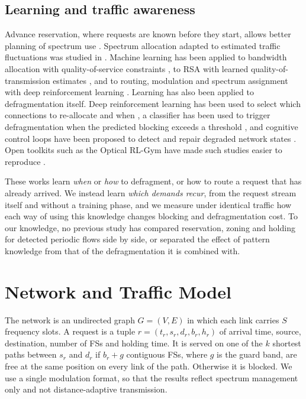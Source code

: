 \documentclass[preprint,12pt]{elsarticle}
\begin{document}
\subsection{Learning and traffic awareness}
Advance reservation, where requests are known before they start, allows better planning of spectrum use \cite{lu2013ar}. Spectrum allocation adapted to estimated traffic fluctuations was studied in \cite{chino2016}. Machine learning has been applied to bandwidth allocation with quality-of-service constraints \cite{panayiotou2019}, to RSA with learned quality-of-transmission estimates \cite{salani2019}, and to routing, modulation and spectrum assignment with deep reinforcement learning \cite{chen2019}. Learning has also been applied to defragmentation itself. Deep reinforcement learning has been used to select which connections to re-allocate and when \cite{etezadi2022,etezadi2023}, a classifier has been used to trigger defragmentation when the predicted blocking exceeds a threshold \cite{davalos2023}, and cognitive control loops have been proposed to detect and repair degraded network states \cite{trindade2021}. Open toolkits such as the Optical RL-Gym have made such studies easier to reproduce \cite{natalino2020}.

These works learn \emph{when} or \emph{how} to defragment, or how to route a request that has already arrived. We instead learn \emph{which demands recur}, from the request stream itself and without a training phase, and we measure under identical traffic how each way of using this knowledge changes blocking and defragmentation cost. To our knowledge, no previous study has compared reservation, zoning and holding for detected periodic flows side by side, or separated the effect of pattern knowledge from that of the defragmentation it is combined with.

\section{Network and Traffic Model}\label{sec:model}
The network is an undirected graph $G=(V,E)$ in which each link carries $S$ frequency slots. A request is a tuple $r=(t_r, s_r, d_r, b_r, h_r)$ of arrival time, source, destination, number of FSs and holding time. It is served on one of the $k$ shortest paths between $s_r$ and $d_r$ if $b_r+g$ contiguous FSs, where $g$ is the guard band, are free at the same position on every link of the path. Otherwise it is blocked. We use a single modulation format, so that the results reflect spectrum management only and not distance-adaptive transmission.
\end{document}
